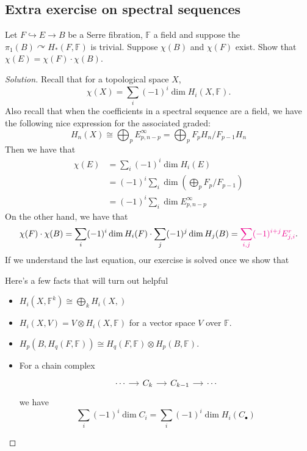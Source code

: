 \documentclass{article}
\numberwithin{equation}{section}
\begin{document}
\subsection{Extra exercise on spectral sequences}\label{ssec:Extra exercise on spectral sequences}
\begin{exercise}[June 20]
	Let $F\hookrightarrow E\to B$ be a Serre fibration, $\mathbb{F}$ a field and suppose the $\pi_{1}(B)\curvearrowright  H_{*}(F,\mathbb{F})$ is trivial. Suppose $\chi(B)$ and $\chi(F)$ exist. Show that $\chi(E)=\chi(F)\cdot \chi(B)$.
\end{exercise}
\begin{proof}[Solution]
	Recall that for a topological space $X$,
	\[\chi(X)=\sum_{i}(-1)^i\dim H_{i}(X,\mathbb{F}).\]
	Also recall that when the coefficients in a spectral sequence are a field, we have the following nice expression for the associated graded:
	\[H_{n}(X)\cong \bigoplus_{p}E^\infty_{p,n-p}=\bigoplus_{p} F_{p}H_{n}/F_{p-1}H_{n} \]
	Then we have that 
	\begin{align*}
		\chi(E)&=\sum_{i}(-1)^i\dim H_{i}(E)\\
		       &=(-1)^i\sum_{i}\dim \left( \bigoplus_{p}F_{p}/F_{p-1}   \right)\\
		       &=(-1)^i\sum_{i}\dim E^\infty_{p,n-p}
	\end{align*}
	On the other hand, we have that
	\[\chi(F)\cdot \chi(B)=\sum_{i}(-1)^i\dim H_{i}(F)\cdot \sum_{j}(-1)^{j}\dim H_{j}(B)={\color{magenta}\sum_{i,j}(-1)^{i+j}E^r_{j,i}}.\]
	If we understand the last equation, our exercise is solved once we show that
	\begin{claim}
		The expression $\sum_{i,j}(-1)^{i+j}E^r_{j,i}}$	does note depend on $r$.
	\end{claim}
	

	Here's a few facts that will turn out helpful
	\begin{itemize}
		\item $H_{i}(X,\mathbb{F}^k)\cong \bigoplus_{k} H_{i}(X,\mathbb{}) $
		\item $H_{i}(X,V)=V\otimes H_{i}(X,\mathbb{F})$ for a vector space $V$ over $\mathbb{F}$.
		\item $H_{p}(B,H_{q}(F,\mathbb{F}))\cong H_{q}(F,\mathbb{F})\otimes H_{p}(B,\mathbb{F})$.
		\item For a chain complex 
			\[\begin{tikzcd}[column sep=small]
				\cdots \arrow[r]&C_{k}\arrow[r]&C_{k-1}\arrow[r]&\cdots
			\end{tikzcd}\]
			we have
			\[\sum_{i}(-1)^i\dim C_i=\sum_{i}(-1)^i\dim H_{i}(C_{\bullet})\]
	\end{itemize}
	
\end{proof}
\end{document}
